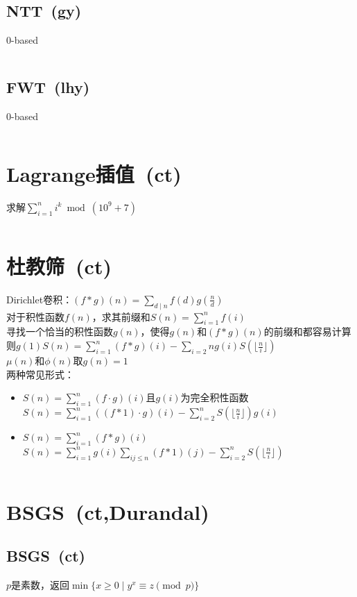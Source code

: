 	\subsection*{NTT\ \small(gy)}
		$ 0 $-based
		\inputminted{cpp}{Math/ntt.cpp}
	\subsection*{FWT\ \small(lhy)}
		$ 0 $-based
		\inputminted{cpp}{Math/fwt.cpp}
\section{Lagrange插值\ \small(ct)}
	求解$ \sum\limits_{i = 1}^{n} i^k \bmod (10^9 + 7)$
	\inputminted{cpp}{Math/lagrange_polynomial.cpp}
\section{杜教筛\ \small(ct)}
	Dirichlet卷积：$ (f \ast g) (n) = \sum\limits_{d \mid n}^{} f(d) g(\frac{n}{d}) $
	\\对于积性函数$ f(n) $，求其前缀和$ S(n) = \sum\limits_{i = 1}^{n} f(i) $
	\\寻找一个恰当的积性函数$ g(n) $，使得$ g(n) $和$ (f \ast g) (n) $的前缀和都容易计算
	\\则$ g(1) S(n) = \sum\limits_{i = 1}^{n} (f \ast g) (i) - \sum\limits_{i = 2}{n} g(i) S(\lfloor \frac{n}{i} \rfloor) $
	\\$ \mu (n) $和$ \phi (n) $取$ g(n) = 1 $
	\\两种常见形式：
	\begin{itemize}[nosep]
		\item $ S(n) = \sum\limits_{i = 1}^{n} (f \cdot g) (i) $且$ g(i) $为完全积性函数
			\\$ S(n) = \sum\limits_{i = 1}^{n} ((f \ast 1) \cdot g) (i) - \sum\limits_{i = 2}^{n} S(\lfloor \frac{n}{i} \rfloor) g(i) $
		\item $ S(n) = \sum\limits_{i = 1}^{n} (f \ast g) (i) $
			\\$ S(n) = \sum\limits_{i = 1}^{n} g (i) \sum\limits_{ij \leq n}^{} (f \ast 1) (j) - \sum\limits_{i = 2}^{n} S(\lfloor \frac{n}{i} \rfloor) $
	\end{itemize}
	\inputminted{cpp}{Math/du_jiao_sieve.cpp}
\section{BSGS\ \small(ct,Durandal)}
	\subsection{BSGS\ \small(ct)}
		$ p $是素数，返回$ \min\lbrace x \geq 0 \mid y^x \equiv z \pmod p \rbrace $
		\inputminted{cpp}{Math/bsgs.cpp}
